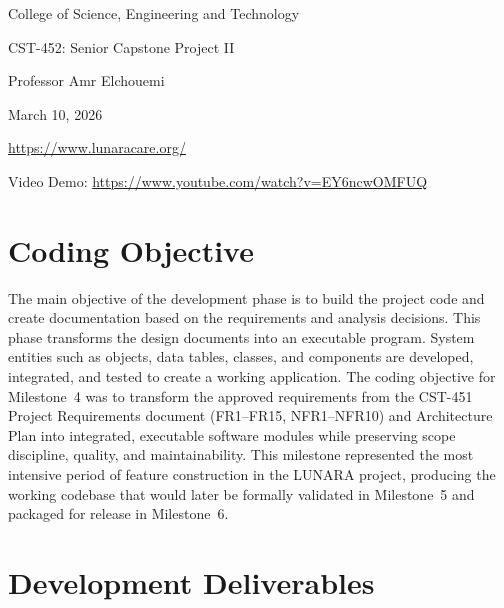 \documentclass[12pt,letterpaper]{article}
\begin{document}
\begin{center}
{\color{white!90}\normalsize College of Science, Engineering and Technology}

{\color{white!90}\normalsize CST-452: Senior Capstone Project II}

{\color{white!90}\normalsize Professor Amr Elchouemi}

\vspace{0.5cm}

{\color{LunaraBlue}\normalsize March 10, 2026}

\vspace{0.6cm}

{\color{LunaraBlue!80}\normalsize \url{https://www.lunaracare.org/}}

\vspace{0.3cm}

{\color{LunaraBlue!80}\normalsize Video Demo: \url{https://www.youtube.com/watch?v=EY6ncwOMFUQ}}

\end{center}

\newpage

\thispagestyle{fancy}
\tableofcontents
\newpage

\section{Coding Objective}

The main objective of the development phase is to build the project code and create documentation based on the requirements and analysis decisions. This phase transforms the design documents into an executable program. System entities such as objects, data tables, classes, and components are developed, integrated, and tested to create a working application. The coding objective for Milestone~4 was to transform the approved requirements from the CST-451 Project Requirements document (FR1--FR15, NFR1--NFR10) and Architecture Plan into integrated, executable software modules while preserving scope discipline, quality, and maintainability. This milestone represented the most intensive period of feature construction in the LUNARA project, producing the working codebase that would later be formally validated in Milestone~5 and packaged for release in Milestone~6.

\section{Development Deliverables}
\end{document}
